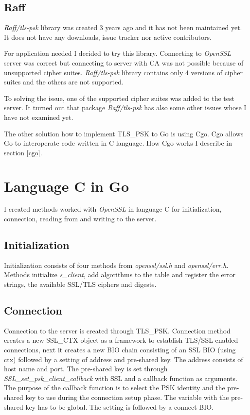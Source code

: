 \documentclass[
  twoside, 12pt, 
  printed, %
  notable,   %
  lof,     %
  lot,     %
]{fithesis3}
\begin{document}
\subsection{Raff}\label{raff}
\textit{Raff/tls-psk} library was created 3 years ago and it has not been 
maintained yet. It does not have any downloads, issue tracker nor active contributors. 

For application needed I decided to try this library. Connecting to \textit{OpenSSL} server was 
correct but connecting to server with CA was not possible because of unsupported cipher 
suites. \textit{Raff/tls-psk} library contains only 4 versions of cipher suites and the others 
are not supported. 

To solving the issue, one of the supported cipher suites was added to the test server. It turned 
out that package \textit{Raff/tls-psk} has also some other issues whose I have not examined yet.

The other solution how to implement TLS\_PSK to Go is using Cgo. Cgo allows Go to 
interoperate code written in C language. How Cgo works I describe in section \ref{cgo}. 


\section{Language C in Go}\label{langCinGo}
I created methods worked with \textit{OpenSSL} in language C for initialization, connection, 
reading from and writing to the server.

\subsection{Initialization}
Initialization consists of four methods from \textit{openssl/ssl.h} and \textit{openssl/err.h}. 
Methods initialize \textit{s\_client}, add algorithms to the table and register the error strings, 
the available SSL/TLS ciphers and digests.

\subsection{Connection}\label{conn}
Connection to the server is created through TLS\_PSK. Connection method creates a new SSL\_CTX 
object as a framework to establish TLS/SSL enabled connections, next it creates a new BIO chain 
consisting of an SSL BIO (using ctx) followed by a setting of address and pre-shared key. The 
address consists of host name and port. The pre-shared key is set through 
\textit{SSL\_set\_psk\_client\_callback} with SSL and a callback function as arguments. The 
purpose of the callback function is to select the PSK identity and the pre-shared key to use 
during the connection setup phase. The variable with the pre-shared key has to be global. The 
setting is followed by a connect BIO.
\end{document}
